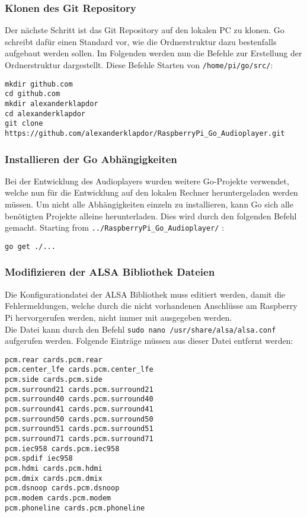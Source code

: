 \begin{enumerate}
\end{enumerate}

\subsubsection{Klonen des Git Repository}
Der nächste Schritt ist das Git Repository auf den lokalen PC zu klonen. Go
schreibt dafür einen Standard vor, wie die Ordnerstruktur dazu bestenfalls
aufgebaut werden sollen. Im Folgenden werden nun die Befehle zur Erstellung der
Ordnerstruktur dargestellt. Diese Befehle Starten von \verb|/home/pi/go/src/|:
\begin{lstlisting}[caption={Klonen des Git Repository}]
mkdir github.com 
cd github.com
mkdir alexanderklapdor
cd alexanderklapdor
git clone https://github.com/alexanderklapdor/RaspberryPi_Go_Audioplayer.git
\end{lstlisting}

\subsubsection{Installieren der Go Abhängigkeiten}
Bei der Entwicklung des Audioplayers wurden weitere Go-Projekte verwendet,
welche nun für die Entwicklung auf den lokalen Rechner heruntergeladen werden
müssen. Um nicht alle Abhängigkeiten einzeln zu installieren, kann Go sich alle
benötigten Projekte alleine herunterladen. Dies wird durch den folgenden Befehl
gemacht.
Starting from \verb|../RaspberryPi_Go_Audioplayer/| :
\begin{lstlisting}[caption={Installieren von Go Abhängigkeiten}]
go get ./... 
\end{lstlisting}

\subsubsection{Modifizieren der \acs{ALSA} Bibliothek Dateien}
Die Konfigurationdatei der \acf{ALSA} Bibliothek muss editiert werden, damit die
Fehlermeldungen, welche durch die nicht vorhandenen Anschlüsse am Raspberry Pi
hervorgerufen werden, nicht immer mit ausgegeben werden. \\
Die Datei kann durch den Befehl \verb|sudo nano /usr/share/alsa/alsa.conf| aufgerufen werden. \newline
Folgende Einträge müssen aus dieser Datei entfernt werden:
\begin{lstlisting}[caption={Liste der zu löschenden Einträge}]
pcm.rear cards.pcm.rear 
pcm.center_lfe cards.pcm.center_lfe 
pcm.side cards.pcm.side 
pcm.surround21 cards.pcm.surround21 
pcm.surround40 cards.pcm.surround40 
pcm.surround41 cards.pcm.surround41 
pcm.surround50 cards.pcm.surround50 
pcm.surround51 cards.pcm.surround51 
pcm.surround71 cards.pcm.surround71 
pcm.iec958 cards.pcm.iec958 
pcm.spdif iec958 
pcm.hdmi cards.pcm.hdmi 
pcm.dmix cards.pcm.dmix 
pcm.dsnoop cards.pcm.dsnoop 
pcm.modem cards.pcm.modem 
pcm.phoneline cards.pcm.phoneline
\end{lstlisting}

